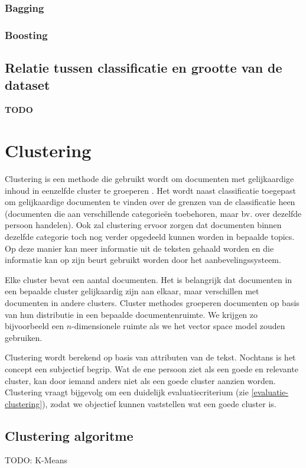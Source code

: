 \subsubsection{Bagging}
\subsubsection{Boosting}

\subsection{Relatie tussen classificatie en grootte van de dataset}
\textbf{TODO}

\section{Clustering}
Clustering is een methode die gebruikt wordt om documenten met gelijkaardige inhoud in eenzelfde cluster te groeperen \cite{Hotho2005}. Het wordt naast classificatie toegepast om gelijkaardige documenten te vinden over de grenzen van de classificatie heen (documenten die aan verschillende categorie\"en toebehoren, maar bv. over dezelfde persoon handelen). Ook zal clustering ervoor zorgen dat documenten binnen dezelfde categorie toch nog verder opgedeeld kunnen worden in bepaalde topics. Op deze manier kan meer informatie uit de teksten gehaald worden en die informatie kan op zijn beurt gebruikt worden door het aanbevelingssysteem. 

Elke cluster bevat een aantal documenten. Het is belangrijk dat documenten in een bepaalde cluster gelijkaardig zijn aan elkaar, maar verschillen met documenten in andere clusters. Cluster methodes groeperen documenten op basis van hun distributie in een bepaalde documentenruimte. We krijgen zo bijvoorbeeld een $n$-dimensionele ruimte als we het vector space model zouden gebruiken.

Clustering wordt berekend op basis van attributen van de tekst. Nochtans is het concept  een subjectief begrip. Wat de ene persoon ziet als een goede en relevante cluster, kan door iemand anders niet als een goede cluster aanzien worden. Clustering vraagt bijgevolg om een duidelijk evaluatiecriterium (zie \ref{evaluatie-clustering}), zodat we objectief kunnen vaststellen wat een goede cluster is.

\subsection{Clustering algoritme}
TODO: K-Means

